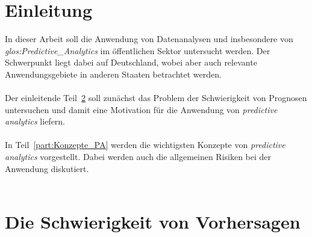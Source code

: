 \chapter{Einleitung}
\label{part:Einleitung}

In dieser Arbeit soll die Anwendung von Datenanalysen und insbesondere
von \emph{\gls{glos:Predictive_Analytics}} im öffentlichen Sektor untersucht
werden.
Der Schwerpunkt liegt dabei auf Deutschland, wobei aber auch relevante
Anwendungsgebiete in anderen Staaten betrachtet werden. \\ \\
Der einleitende Teil~\ref{part:Schw_Vorhersagen} soll zunächst das Problem der
Schwierigkeit von
Prognosen untersuchen und damit eine Motivation für die Anwendung von 
\emph{predictive analytics} liefern. \\ \\
In Teil~\ref{part:Konzepte_PA} werden die wichtigsten Konzepte von
\emph{predictive analytics} vorgestellt. Dabei werden auch die allgemeinen
Risiken bei der Anwendung diskutiert. \\ \\

\chapter{Die Schwierigkeit von Vorhersagen}
\label{part:Schw_Vorhersagen}

